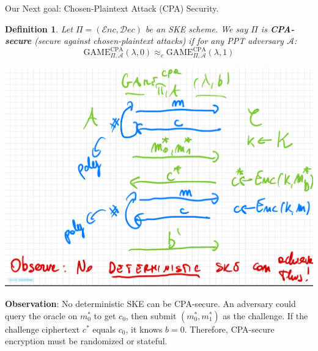 \documentclass[11pt, a4paper]{article}
\newcommand{\enc}{\mathcal{E}nc}
\newcommand{\dec}{\mathcal{D}ec}
\newcommand{\game}{\text{GAME}}
\newtheorem{defn}{Definition}
\begin{document}
Our Next goal: Chosen-Plaintext Attack (CPA) Security.
\begin{defn}
    Let $\Pi = (\enc, \dec)$ be an SKE scheme. We say $\Pi$ is \textbf{CPA-secure} (secure against chosen-plaintext attacks) if for any PPT adversary $\mathcal{A}$:
    $$ \game_{\Pi, \mathcal{A}}^{\text{CPA}}(\lambda, 0) \approx_c \game_{\Pi, \mathcal{A}}^{\text{CPA}}(\lambda, 1) $$

\end{defn}
\begin{center}
    \includegraphics[scale=0.4]{img/Comp_sec/CPA.png}
\end{center}


\textbf{Observation}: No deterministic SKE can be CPA-secure. An adversary could query the oracle on $m_0^*$ to get $c_0$, then submit $(m_0^*, m_1^*)$ as the challenge. If the challenge ciphertext $c^*$ equals $c_0$, it knows $b=0$. Therefore, CPA-secure encryption must be randomized or stateful.
\end{document}
